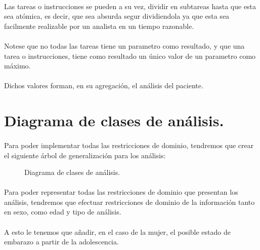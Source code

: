 \documentclass[a4paper,10pt]{article}
\begin{document}
\paragraph{}
Las tareas o instrucciones se pueden a su vez, dividir en subtareas hasta que esta sea atómica, es decir, que sea absurda segur dividiendola ya que esta sea facilmente realizable por un analista en un tiempo razonable.

\paragraph{}
Notese que no todas las tareas tiene  un parametro como resultado, y que una tarea o instrucciones, tiene como resultado un único valor de un parametro como máximo.

\paragraph{}
Dichos valores forman, en su agregación, el análisis del paciente.



\section{Diagrama de clases de análisis.}
\paragraph{}
Para poder implementar todas las restricciones de dominio, tendremos que crear el siguiente árbol de generalización para los análisis:\\
\begin{figure}[hbt]
	\scalebox{0.39}{}
	\caption{Diagrama de clases de análisis.}
	\label{fig:diagramaanalisis}
\end{figure}
\paragraph{}
Para poder representar todas las restricciones de dominio que presentan los análisis, tendremos que efectuar restricciones de dominio de la información tanto en sexo, como edad y tipo de análisis.
\paragraph{}
A esto le tenemos que añadir, en el caso de la mujer, el posible estado de embarazo a partir de la adolescencia.
\end{document}

